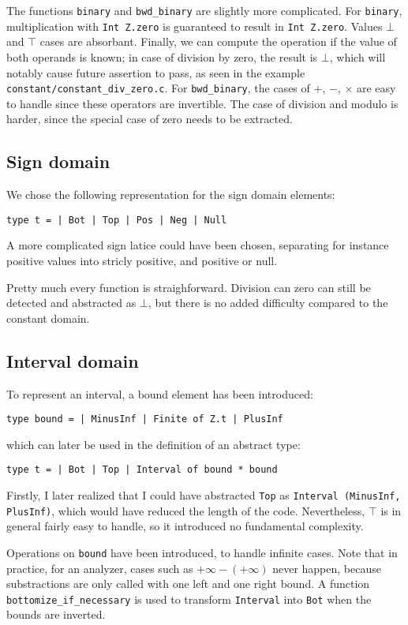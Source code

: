 \documentclass[12pt,a4paper]{article}
\begin{document}
The functions \texttt{binary} and \texttt{bwd\_binary} are slightly more complicated. For \texttt{binary}, multiplication with \texttt{Int Z.zero} is guaranteed to result in \texttt{Int Z.zero}. Values $\bot$ and $\top$ cases are absorbant. Finally, we can compute the operation if the value of both operands is known; in case of division by zero, the result is $\bot$, which will notably cause future assertion to pass, as seen in the example \texttt{constant/constant\_div\_zero.c}. For \texttt{bwd\_binary}, the cases of $+$, $-$, $\times$ are easy to handle since these operators are invertible. The case of division and modulo is harder, since the special case of zero needs to be extracted.

\subsection{Sign domain}
We chose the following representation for the sign domain elements:
\begin{center}
    \texttt{type t = | Bot | Top | Pos | Neg | Null}
\end{center}
A more complicated sign latice could have been chosen, separating for instance positive values into stricly positive, and positive or null.

Pretty much every function is straighforward. Division can zero can still be detected and abstracted as $\bot$, but there is no added difficulty compared to the constant domain.

\subsection{Interval domain}
To represent an interval, a bound element has been introduced:
\begin{center}
    \texttt{type bound = | MinusInf | Finite of Z.t | PlusInf}
\end{center}
which can later be used in the definition of an abstract type:
\begin{center}
    \texttt{type t  = | Bot | Top | Interval of bound * bound}
\end{center}
Firstly, I later realized that I could have abstracted \texttt{Top} as \texttt{Interval (MinusInf, PlusInf)}, which would have reduced the length of the code. Nevertheless, $\top$ is in general fairly easy to handle, so it introduced no fundamental complexity.

Operations on \texttt{bound} have been introduced, to handle infinite cases. Note that in practice, for an analyzer, cases such as $+\infty - (+\infty)$ never happen, because substractions are only called with one left and one right bound.
A function \texttt{bottomize\_if\_necessary} is used to transform \texttt{Interval} into \texttt{Bot} when the bounds are inverted.
\end{document}
